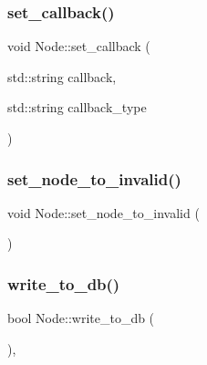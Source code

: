 \mbox{\label{class_node_afda492d07d8c3ed0e714d0249e015ffa}} 
\subsubsection{\texorpdfstring{set\+\_\+callback()}{set\_callback()}\hspace{0.1cm}{\footnotesize\ttfamily [2/2]}}
{\footnotesize\ttfamily void Node\+::set\+\_\+callback (\begin{DoxyParamCaption}\item[{std\+::string}]{callback,  }\item[{std\+::string}]{callback\+\_\+type }\end{DoxyParamCaption})}

\mbox{\label{class_node_ab9fe9ebcddc19a16dc518fd29e584da8}} 
\subsubsection{\texorpdfstring{set\+\_\+node\+\_\+to\+\_\+invalid()}{set\_node\_to\_invalid()}}
{\footnotesize\ttfamily void Node\+::set\+\_\+node\+\_\+to\+\_\+invalid (\begin{DoxyParamCaption}{ }\end{DoxyParamCaption})\hspace{0.3cm}{\ttfamily [inline]}}

\mbox{\label{class_node_ad5cacb320e423275faef1bfc8c7a365b}} 
\subsubsection{\texorpdfstring{write\+\_\+to\+\_\+db()}{write\_to\_db()}}
{\footnotesize\ttfamily bool Node\+::write\+\_\+to\+\_\+db (\begin{DoxyParamCaption}{ }\end{DoxyParamCaption})\hspace{0.3cm}{\ttfamily [final]}, {\ttfamily [virtual]}}



